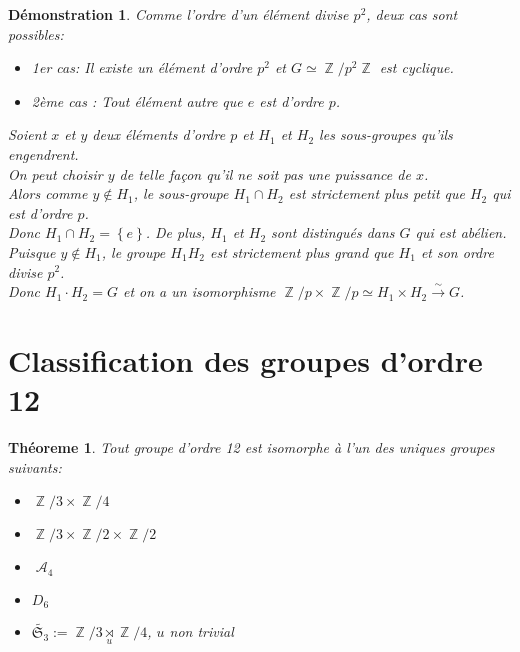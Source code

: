 \documentclass[a4paper, oneside]{report}
\theoremstyle{break}
\newtheorem{thm}{Théoreme}[section] %
\newtheorem*{demonstration}{Démonstration}
\newcommand{\x}{\times}
\newcommand{\fong}{\overset{\sim}{\rightarrow}}
\DeclareMathOperator{\Z}{\mathbb{Z}}
\DeclareMathOperator{\A}{\mathcal{A}}
\renewcommand{\S}{\mathfrak{S}}
\DeclarePairedDelimiter\ens{\left\{ }{\right\} }%
\renewcommand{\ens}[1]{\left\{ #1 \right\} }%
\newcommand{\us}{\underset}
\begin{document}
\begin{demonstration}
Comme l'ordre d'un élément divise $p^2$, deux cas sont possibles:
\begin{itemize}
\item 1er cas: Il existe un élément d'ordre $p^2$ et $G \simeq \Z/p^2\Z$ est cyclique.

\item 2ème cas : Tout élément autre que $e$ est d'ordre $p$.
\end{itemize}
Soient $x$ et $y$ deux éléments d'ordre $p$ et $H_1$ et $H_2$ les sous-groupes qu'ils engendrent.\\
On peut choisir $y$ de telle façon qu'il ne soit pas une puissance de $x$.\\
Alors comme $y \notin H_1$, le sous-groupe $H_1 \cap H_2$ est strictement plus petit que $H_2$ qui est d'ordre $p$.\\
Donc $H_1 \cap H_2 = \ens{e}$. De plus, $H_1$ et $H_2$ sont distingués dans $G$ qui est abélien.\\
Puisque $y \notin H_1$, le groupe $H_1 H_2$ est strictement plus grand que $H_1$ et son ordre divise $p^2$.\\
Donc $H_1 \cdot H_2 = G$ et on a un isomorphisme $\Z/p \x \Z/p \simeq H_1\x H_2 \fong G$.
\end{demonstration}

\section{Classification des groupes d'ordre 12}

\begin{thm}
Tout groupe d'ordre 12 est isomorphe à l'un des uniques groupes suivants:
\begin{itemize}[label=$\bullet$]
\item $\Z/3 \times \Z/4$

\item $\Z/3 \times \Z/2 \times \Z/2$

\item $\A_4$

\item $D_6$

\item $\tilde{\S_3} := \Z/3 \us{u}{\rtimes} \Z/4$, $u$ non trivial
\end{itemize}
\end{thm}
\end{document}
